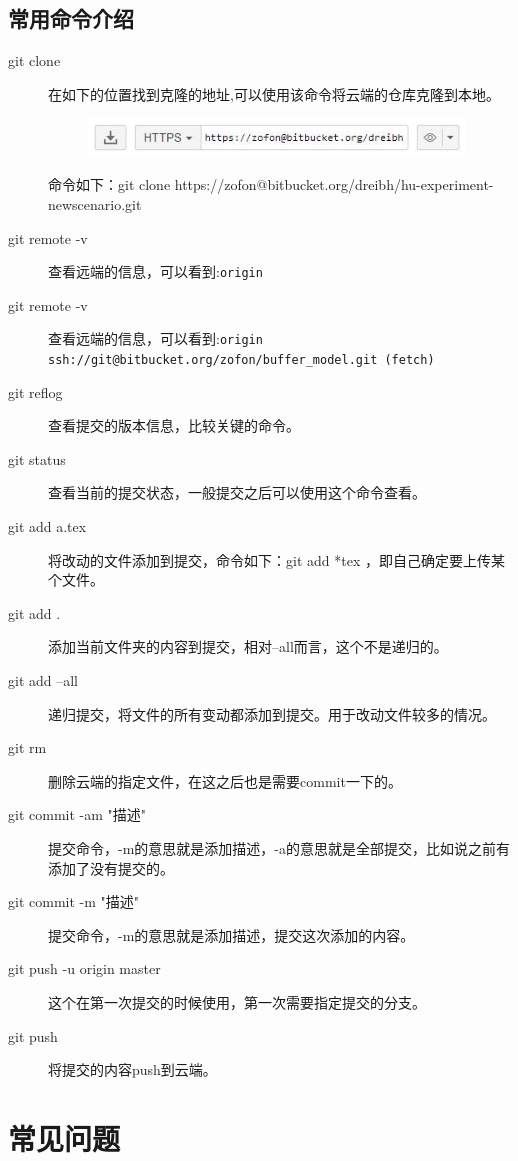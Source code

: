 \documentclass[a4paper,12pt]{ctexart}
\begin{document}
\subsection{常用命令介绍}
\begin{description}
  \item[git clone] 在如下的位置找到克隆的地址,可以使用该命令将云端的仓库克隆到本地。
        \begin{figure}[H]
        \centering
        \includegraphics[width=10cm]{figures/clone_address.jpg}
        \end{figure}
        命令如下：git clone https://zofon@bitbucket.org/dreibh/hu-experiment-newscenario.git
  \item[git remote -v] 查看远端的信息，可以看到:\verb|origin|
  \item[git remote -v] 查看远端的信息，可以看到:\verb|origin  ssh://git@bitbucket.org/zofon/buffer_model.git (fetch)|
  \item[git reflog] 查看提交的版本信息，比较关键的命令。
  \item[git status] 查看当前的提交状态，一般提交之后可以使用这个命令查看。

  \item[git add a.tex] 将改动的文件添加到提交，命令如下：git add *tex ，即自己确定要上传某个文件。
  \item[git add .] 添加当前文件夹的内容到提交，相对--all而言，这个不是递归的。
  \item[git add --all] 递归提交，将文件的所有变动都添加到提交。用于改动文件较多的情况。

  \item[git rm] 删除云端的指定文件，在这之后也是需要commit一下的。

  \item[git commit -am "描述"] 提交命令，-m的意思就是添加描述，-a的意思就是全部提交，比如说之前有添加了没有提交的。
  \item[git commit -m  "描述"] 提交命令，-m的意思就是添加描述，提交这次添加的内容。

  \item[git push -u origin master] 这个在第一次提交的时候使用，第一次需要指定提交的分支。
  \item[git push] 将提交的内容push到云端。
\end{description}

\newpage
\section{常见问题}
\end{document}
